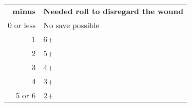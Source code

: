\begin{minipage}[t]{0.485\textwidth}

\begin{center}
  \begin{tabular}{r l}
  \hline
    \textbf{\Armour{} minus \AP{}} & \textbf{Needed roll to disregard the wound} \\
    0 or less & No save possible \\
    1 & 6+ \\
    2 & 5+ \\
    3 & 4+ \\
    4 & 3+ \\
    5 or 6 & 2+ \\
    \hline
  \end{tabular}
\end{center}

\end{minipage}

\newpage
{}

